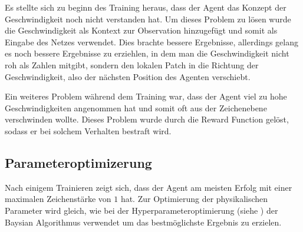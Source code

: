 Es stellte sich zu beginn des Training heraus, dass der Agent das Konzept der
Geschwindigkeit noch nicht verstanden hat. Um dieses Problem zu lösen wurde die %
Geschwindigkeit als Kontext zur Observation hinzugefügt und somit als Eingabe   %
des Netzes verwendet. Dies brachte bessere Ergebnisse, allerdings gelang es noch
bessere Ergebnisse zu erziehlen, in dem man die Geschwindigkeit nicht roh als
Zahlen mitgibt, sondern den lokalen Patch in die Richtung der Geschwindigkeit,
also der nächsten Position des Agenten verschiebt.

Ein weiteres Problem während dem Training war, dass der Agent viel zu hohe
Geschwindigkeiten angenommen hat und somit oft aus der Zeichenebene verschwinden
wollte. Dieses Problem wurde durch die Reward Function gelöst, sodass er bei
solchem Verhalten bestraft wird.


\subsection*{Parameteroptimizerung}
Nach einigem Trainieren zeigt sich, dass der Agent am meisten Erfolg mit einer
maximalen Zeichenstärke von $1$ hat. Zur Optimierung der physikalischen
Parameter wird gleich, wie bei der Hyperparameteroptimierung (siehe %
) der Baysian Algorithmus verwendet um
das bestmöglichste Ergebnis zu erzielen.


















